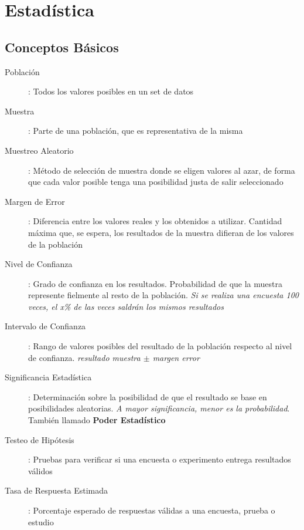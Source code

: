 
\section{Estadística}
\subsection{Conceptos Básicos}
\begin{description}
    \item [Población]{ : Todos los valores posibles en un set de datos}
    \item [Muestra]{ : Parte de una población, que es representativa de la misma}
    \item [Muestreo Aleatorio]{ : Método de selección de muestra donde se eligen valores al azar, de forma que cada valor posible tenga una posibilidad justa de salir seleccionado}
    \item [Margen de Error]{ : Diferencia entre los valores reales y los obtenidos a utilizar. Cantidad máxima que, se espera, los resultados de la muestra difieran de los valores de la población}
    \item [Nivel de Confianza]{ : Grado de confianza en los resultados. Probabilidad de que la muestra represente fielmente al resto de la población. \textit{Si se realiza una encuesta 100 veces, el x\% de las veces saldrán los mismos resultados}}
    \item [Intervalo de Confianza]{ : Rango de valores posibles del resultado de la población respecto al nivel de confianza. \textit{resultado muestra ${\pm}$ margen error}}
    \item [Significancia Estadística]{ : Determinación sobre la posibilidad de que el resultado se base en posibilidades aleatorias. \textit{A mayor significancia, menor es la probabilidad}. También llamado \textbf{Poder Estadístico}} 
    \item [Testeo de Hipótesis]{ : Pruebas para verificar si una encuesta o experimento entrega resultados válidos}
    \item [Tasa de Respuesta Estimada]{ : Porcentaje esperado de respuestas válidas a una encuesta, prueba o estudio}
\end{description}


